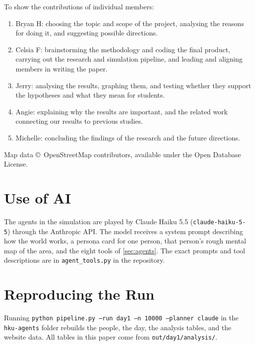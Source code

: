 \documentclass[9pt]{ieeeconf}
\begin{document}
\begin{acknowledgments}
To show the contributions of individual members:
\begin{enumerate}
    \item Bryan H: choosing the topic and scope of the project, analysing the reasons for doing it, and suggesting possible directions.
    \item Celsia F: brainstorming the methodology and coding the final product, carrying out the research and simulation pipeline, and leading and aligning members in writing the paper.
    \item Jerry: analysing the results, graphing them, and testing whether they support the hypotheses and what they mean for students.
    \item Angie: explaining why the results are important, and the related work connecting our results to previous studies.
    \item Michelle: concluding the findings of the research and the future directions.
\end{enumerate}
Map data \copyright\ OpenStreetMap contributors, available under the Open Database License.
\end{acknowledgments}





\appendix

\section{Use of AI}
\label{sec:appendix_ai}
The agents in the simulation are played by Claude Haiku 5.5 (\texttt{claude-haiku-5-5}) through the Anthropic API. The model receives a system prompt describing how the world works, a persona card for one person, that person's rough mental map of the area, and the eight tools of \cref{sec:agents}. The exact prompts and tool descriptions are in \texttt{agent\_tools.py} in the repository.

\section{Reproducing the Run}
\label{sec:appendix_repro}
Running \texttt{python pipeline.py --run day1 --n 10000 --planner claude} in the \texttt{hku-agents} folder rebuilds the people, the day, the analysis tables, and the website data. All tables in this paper come from \texttt{out/day1/analysis/}.
\end{document}
